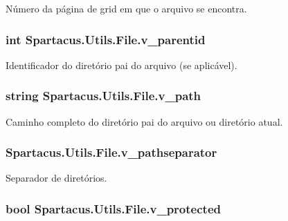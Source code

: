 Número da página de grid em que o arquivo se encontra. 

\hypertarget{classSpartacus_1_1Utils_1_1File_a645b1c73f5a3bac42a4ceb6fc1bdb06b}{
\subsubsection[{v\+\_\+parentid}]{\setlength{\rightskip}{0pt plus 5cm}int Spartacus.\+Utils.\+File.\+v\+\_\+parentid}}\label{classSpartacus_1_1Utils_1_1File_a645b1c73f5a3bac42a4ceb6fc1bdb06b}


Identificador do diretório pai do arquivo (se aplicável). 

\hypertarget{classSpartacus_1_1Utils_1_1File_a8f91c323ee7ab05e66c18d2006a6569a}{
\subsubsection[{v\+\_\+path}]{\setlength{\rightskip}{0pt plus 5cm}string Spartacus.\+Utils.\+File.\+v\+\_\+path}}\label{classSpartacus_1_1Utils_1_1File_a8f91c323ee7ab05e66c18d2006a6569a}


Caminho completo do diretório pai do arquivo ou diretório atual. 

\hypertarget{classSpartacus_1_1Utils_1_1File_a45f2a42a093161cbe318734f67264294}{
\subsubsection[{v\+\_\+pathseparator}]{ Spartacus.\+Utils.\+File.\+v\+\_\+pathseparator}}\label{classSpartacus_1_1Utils_1_1File_a45f2a42a093161cbe318734f67264294}


Separador de diretórios. 

\hypertarget{classSpartacus_1_1Utils_1_1File_a5ede704209b7aa9ed88b414629228bd9}{
\subsubsection[{v\+\_\+protected}]{\setlength{\rightskip}{0pt plus 5cm}bool Spartacus.\+Utils.\+File.\+v\+\_\+protected}}\label{classSpartacus_1_1Utils_1_1File_a5ede704209b7aa9ed88b414629228bd9}


